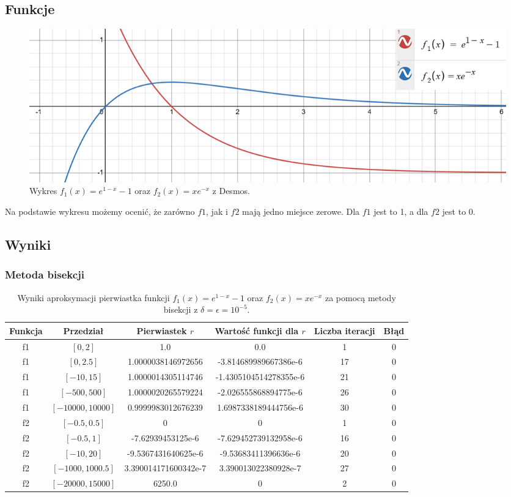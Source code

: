 \documentclass{article}
\begin{document}
\subsection{Funkcje}
\begin{figure}[H]
\centering
\includegraphics[width=\textwidth]{plot6.png}
\caption{Wykres \( f_1(x) = e^{1-x} - 1 \) oraz \( f_2(x) = x e^{-x} \) z Desmos.}
\end{figure}

Na podstawie wykresu możemy ocenić, że zarówno $f1$, jak i $f2$ mają jedno miejsce zerowe. Dla $f1$ jest to 1, a dla $f2$ jest to 0.

\subsection{Wyniki}
\subsubsection{Metoda bisekcji}
\begin{table}[H]
\begin{adjustbox}{center}
\begin{tabular}{|c|c|c|c|c|c|}
    \hline
    Funkcja & Przedział & Pierwiastek $r$ & Wartość funkcji dla $r$ & Liczba iteracji & Błąd\\
    \hline
    f1 & $[0, 2]$ & 1.0 & 0.0 & 1 & 0\\
    \hline
    f1 & $[0, 2.5]$ & 1.0000038146972656 & -3.814689989667386e-6 & 17 & 0\\
    \hline
    f1 & $[-10, 15]$ & 1.0000014305114746 & -1.4305104514278355e-6 & 21 & 0\\
    \hline
    f1 & $[-500, 500]$ & 1.0000020265579224 & -2.026555868894775e-6 & 26 & 0\\
    \hline
    f1 & $[-10000, 10000]$ & 0.9999983012676239 & 1.6987338189444756e-6 & 30 & 0\\
    \hline
    \hline
    f2 & $[-0.5, 0.5]$ & 0 & 0 & 1 & 0\\
    \hline
    f2 & $[-0.5, 1]$ & -7.62939453125e-6 & -7.629452739132958e-6 & 16 & 0\\
    \hline
    f2 & $[-10, 20]$ & -9.5367431640625e-6 & -9.53683411396636e-6 & 20 & 0\\
    \hline
    f2 & $[-1000, 1000.5]$ & 3.390014171600342e-7 & 3.390013022380928e-7 & 27 & 0\\
    \hline
    f2 & $[-20000, 15000]$ & 6250.0 & 0 & 2 & 0\\
    \hline
\end{tabular}
\end{adjustbox}
\caption{Wyniki aproksymacji pierwiastka funkcji \( f_1(x) = e^{1-x} - 1 \) oraz \( f_2(x) = x e^{-x} \) za pomocą metody bisekcji z $\delta = \epsilon = 10^{-5}$.}
\end{table}
\end{document}
